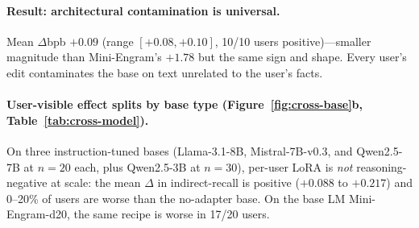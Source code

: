 \documentclass{article}
\begin{document}
\paragraph{Result: architectural contamination is universal.}
Mean $\Delta$bpb $+0.09$ (range $[+0.08, +0.10]$, 10/10 users
positive)—smaller magnitude than Mini-Engram's $+1.78$ but the same
sign and shape. Every user's edit contaminates the base on text
unrelated to the user's facts.

\paragraph{User-visible effect splits by base type
(Figure~\ref{fig:cross-base}b, Table~\ref{tab:cross-model}).}
On three instruction-tuned bases (Llama-3.1-8B, Mistral-7B-v0.3, and
Qwen2.5-7B at $n{=}20$ each, plus Qwen2.5-3B at $n{=}30$), per-user
LoRA is \emph{not} reasoning-negative at scale: the mean $\Delta$ in
indirect-recall is positive ($+0.088$ to $+0.217$) and 0--20\% of
users are worse than the no-adapter base. On the base LM
Mini-Engram-d20, the same recipe is worse in 17/20 users.

\begin{table}[t]
  \centering
  \caption{Per-user LoRA's effect on indirect reasoning: cross-model.
  ``mean $\Delta$'' is the average user-level shift in indirect recall.
  ``worse'' counts users with strictly negative $\Delta$. The
  architectural contamination is base-independent (val\_bpb
  $\Delta>0$ on every base); the user-level effect is not.}
  \label{tab:cross-model}
\end{table}
\end{document}
